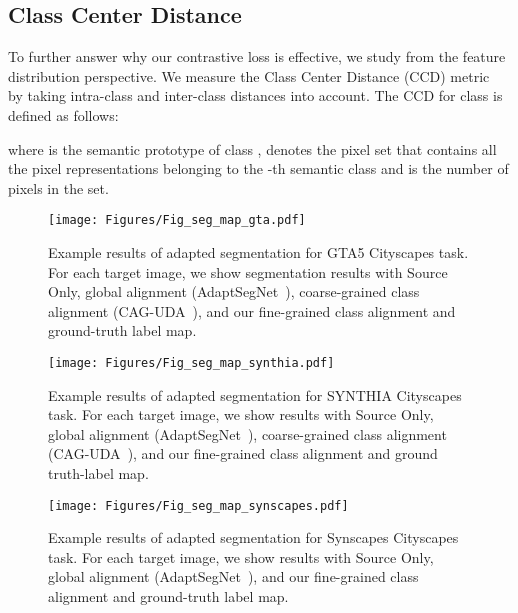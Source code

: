 \documentclass[runningheads]{llncs}
\begin{document}
\subsection{Class Center Distance}
To further answer why our contrastive loss is effective, we study from the feature distribution perspective. We measure the Class Center Distance (CCD) metric~\cite{wang2020class} by taking intra-class and inter-class distances into account. The CCD for class  is defined as follows:
\begin{small}
   
\end{small}where  is the semantic prototype of class ,  denotes the pixel set that contains all the pixel representations belonging to the -th semantic class and  is the number of pixels in the set.

\begin{figure*}
   \centering
   \texttt{[image: Figures/Fig\_seg\_map\_gta.pdf]}
   \vspace{-3mm}
   \caption{Example results of adapted segmentation for GTA5  Cityscapes task. For each target image, we show segmentation results with Source Only, global alignment (AdaptSegNet~\cite{tsai2018learning}), coarse-grained class alignment (CAG-UDA~\cite{zhang2019category}), and our fine-grained class alignment and ground-truth label map.}
   \label{Fig_seg_map_gta}
\end{figure*}

\begin{figure*}
   \centering
   \texttt{[image: Figures/Fig\_seg\_map\_synthia.pdf]}
\caption{Example results of adapted segmentation for SYNTHIA  Cityscapes task. For each target image, we show results with Source Only, global alignment (AdaptSegNet~\cite{tsai2018learning}), coarse-grained class alignment (CAG-UDA~\cite{zhang2019category}), and our fine-grained class alignment and ground truth-label map.}
   \label{Fig_seg_map_synthia}
\end{figure*}

\begin{figure*}
   \centering
   \texttt{[image: Figures/Fig\_seg\_map\_synscapes.pdf]}
\caption{Example results of adapted segmentation for Synscapes  Cityscapes task. For each target image, we show results with Source Only, global alignment (AdaptSegNet~\cite{tsai2018learning}), and our fine-grained class alignment and ground-truth label map.}
   \label{Fig_seg_map_synscapes}
\end{figure*}
\end{document}
